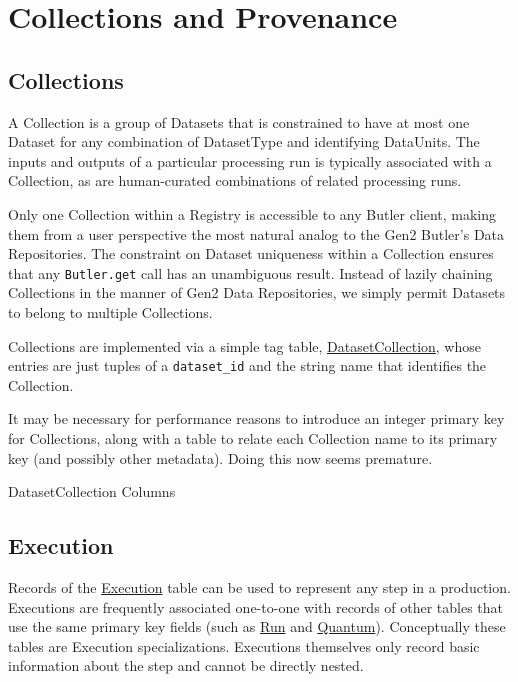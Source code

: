 \documentclass[DM,toc]{lsstdoc}
\newcommand{\tblref}[1]{\hyperref[tbl:#1]{#1}}
\newcommand{\coltable}[1]{
    \begin{table}[htb]
        {
            \footnotesize
            
        }
        \caption{#1 Columns}
        \label{tbl:#1}
    \end{table}
}
\newcommand{\joininc}[1]{}
\begin{document}
\joininc{ExposureRangeJoin}
\joininc{MultiCameraExposureJoin}
\joininc{VisitSensorSkyPixJoin}
\joininc{VisitSkyPixJoin}
\joininc{PatchSkyPixJoin}
\joininc{TractSkyPixJoin}
\joininc{VisitSensorPatchJoin}
\joininc{VisitPatchJoin}
\joininc{VisitSensorTractJoin}
\joininc{VisitTractJoin}

\section{Collections and Provenance}
\label{sec:collections-and-provenance}

\subsection{Collections}
\label{sec:collections}

A Collection is a group of Datasets that is constrained to have at most one Dataset for any combination of DatasetType and identifying DataUnits.
The inputs and outputs of a particular processing run is typically associated with a Collection, as are human-curated combinations of related processing runs.

Only one Collection within a Registry is accessible to any Butler client, making them from a user perspective the most natural analog to the Gen2 Butler's Data Repositories.
The constraint on Dataset uniqueness within a Collection ensures that any \texttt{Butler.get} call has an unambiguous result.
Instead of lazily chaining Collections in the manner of Gen2 Data Repositories, we simply permit Datasets to belong to multiple Collections.

Collections are implemented via a simple tag table, \tblref{DatasetCollection}, whose entries are just tuples of a \texttt{dataset\_id} and the string name that identifies the Collection.

It may be necessary for performance reasons to introduce an integer primary key for Collections, along with a table to relate each Collection name to its primary key (and possibly other metadata).
Doing this now seems premature.

\coltable{DatasetCollection}

\subsection{Execution}
\label{sec:excution}

Records of the \tblref{Execution} table can be used to represent any step in a production.
Executions are frequently associated one-to-one with records of other tables that use the same primary key fields (such as \hyperref[sec:run]{Run} and \hyperref[sec:quantum]{Quantum}).
Conceptually these tables are Execution specializations.
Executions themselves only record basic information about the step and cannot be directly nested.
\end{document}
